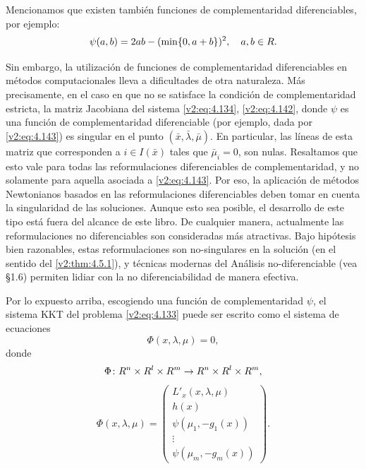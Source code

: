 Mencionamos que existen también funciones de complementaridad diferenciables, por ejemplo:
\begin{equation}
    \psi(a, b) = 2ab - (\min\{0, a + b\})^2, \quad a, b \in R.
    \label{v2:eq:4.143}
\end{equation}


Sin embargo, la utilización de funciones de complementaridad diferenciables en métodos computacionales lleva a dificultades de otra naturaleza. Más precisamente, en el caso en que no se satisface la condición de complementaridad estricta, la matriz Jacobiana del sistema \eqref{v2:eq:4.134}, \eqref{v2:eq:4.142}, donde $\psi$ es una función de complementaridad diferenciable (por ejemplo, dada por \eqref{v2:eq:4.143}) es singular en el punto $(\bar{x}, \bar{\lambda}, \bar{\mu})$. En particular, las líneas de esta matriz que corresponden a $i \in I(\bar{x})$ tales que $\bar{\mu}_i = 0$, son nulas. Resaltamos que esto vale para todas las reformulaciones diferenciables de complementaridad, y no solamente para aquella asociada a \eqref{v2:eq:4.143}. Por eso, la aplicación de métodos Newtonianos basados en las reformulaciones diferenciables deben tomar en cuenta la singularidad de las soluciones. Aunque esto sea posible, el desarrollo de este tipo está fuera del alcance de este libro. De cualquier manera, actualmente las reformulaciones no diferenciables son consideradas más atractivas. Bajo hipótesis bien razonables, estas reformulaciones son no-singulares en la solución (en el sentido del \cref{v2:thm:4.5.1}), y técnicas modernas del Análisis no-diferenciable (vea \S 1.6) permiten lidiar con la no diferenciabilidad de manera efectiva.

Por lo expuesto arriba, escogiendo una función de complementaridad $\psi$, el sistema KKT del problema \eqref{v2:eq:4.133} puede ser escrito como el sistema de ecuaciones
\begin{equation}
    \Phi(x, \lambda, \mu) = 0,
    \label{v2:eq:4.144}
\end{equation}
donde
\[
    \Phi \colon R^n \times R^l \times R^m \to R^n \times R^l \times R^m,
\]
\begin{equation}
    \Phi(x, \lambda, \mu) = \begin{pmatrix} L'_x(x, \lambda, \mu) \\ h(x) \\ \psi(\mu_1, -g_1(x)) \\ \vdots \\ \psi(\mu_m, -g_m(x)) \end{pmatrix}.
    \label{v2:eq:4.145}
\end{equation}

